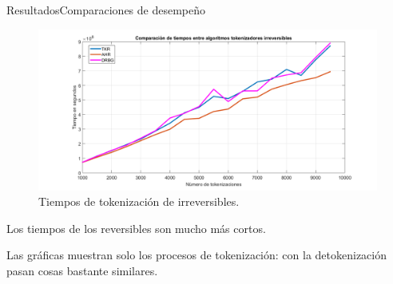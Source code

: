 \begin{frame}{Resultados}{Comparaciones de desempeño}
  {
    \begin{figure}[H]
      \begin{center}
        \includegraphics[width=1.0\linewidth]
          {../../../diagramas_comunes/desempenio/tok_irrev.png}
        \caption{Tiempos de tokenización de irreversibles.}
      \end{center}
    \end{figure}
  }

  \note
  {
    Los tiempos de los reversibles son mucho más cortos.

    Las gráficas muestran solo los procesos de tokenización: con la
    detokenización pasan cosas bastante similares.
  }

\end{frame}

